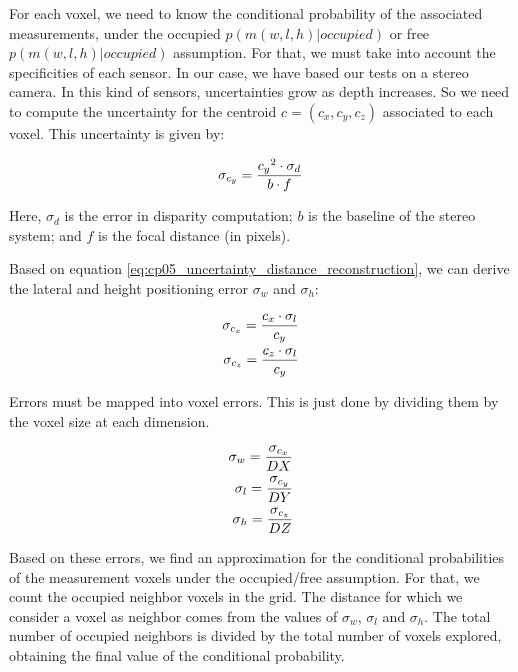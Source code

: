 For each voxel, we need to know the conditional probability of the associated measurements, under the occupied $p(m(w,l,h)|occupied)$ or free $p(m(w,l,h)|occupied)$ assumption. For that, we must take into account the specificities of each sensor. In our case, we have based our tests on a stereo camera. In this kind of sensors, uncertainties grow as depth increases. So we need to compute the uncertainty for the centroid $c=(c_x, c_y, c_z)$ associated to each voxel. This uncertainty is given by:

\begin{equation}\label{eq:cp05_uncertainty_distance_reconstruction}
\sigma_{c_y}={{{c_y}^2 \cdot \sigma_d} \over {b \cdot f}}
\end{equation}

Here, $\sigma_d$ is the error in disparity computation; $b$ is the baseline of the stereo system; and $f$ is the focal distance (in pixels).

Based on equation \ref{eq:cp05_uncertainty_distance_reconstruction}, we can derive the lateral and height positioning error $\sigma_w$ and $\sigma_h$:

\begin{equation}\label{eq:cp05_uncertainty_lateral_and_height_reconstruction}
\begin{align}
\sigma_{c_x}={{{c_x} \cdot \sigma_l} \over {c_y}} \\
\sigma_{c_z}={{{c_z} \cdot \sigma_l} \over {c_y}}
\end{align}
\end{equation}

Errors must be mapped into voxel errors. This is just done by dividing them by the voxel size at each dimension.

\begin{equation}\label{eq:cp05_uncertainty_voxel_errors}
\begin{align}
\sigma_w={{\sigma_{c_x}} \over {DX}} \\
\sigma_l={{\sigma_{c_y}} \over {DY}} \\
\sigma_h={{\sigma_{c_z}} \over {DZ}}
\end{align}
\end{equation}

Based on these errors, we find an approximation for the conditional probabilities of the measurement voxels under the occupied/free assumption. For that, we count the occupied neighbor voxels in the grid. The distance for which we consider a voxel as neighbor comes from the values of $\sigma_w$, $\sigma_l$ and $\sigma_h$. The total number of occupied neighbors is divided by the total number of voxels explored, obtaining the final value of the conditional probability.

